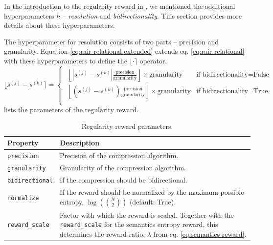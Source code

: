 In the introduction to the regularity reward in , we mentioned the additional hyperparameters \(h\) -- \emph{resolution} and \emph{bidirectionality}.
This section provides more details about these hyperparameters.

The hyperparameter for resolution consists of two parts -- precision and granularity.
Equation \eqref{eq:rair-relational-extended} extends eq. \eqref{eq:rair-relational} with these hyperparameters to define the \(\lfloor \cdot \rceil\) operator.
\begin{equation}
    \lfloor s^{(j)} - s^{(k)} \rceil = \begin{cases}\begin{aligned}
        \left\lfloor \left| s^{(j)} - s^{(k)} \right| \frac{\text{precision}}{\text{granularity}} \right\rfloor \times \text{granularity} &\text{if bidirectionality} = \text{False}\\
        \left\lfloor \left( s^{(j)} - s^{(k)} \right) \frac{\text{precision}}{\text{granularity}} \right\rfloor \times \text{granularity} &\text{if bidirectionality} = \text{True}\\
    \end{aligned}\end{cases}
    \label{eq:rair-relational-extended}
\end{equation}
 lists the parameters of the regularity reward.
\begin{table}[H]
    \centering
    \begin{tabularx}{\textwidth}{C{3.9cm} L}
        \hline
        Property & Description\\
        \hline
        \texttt{precision} & Precision of the compression algorithm.\\
        \texttt{granularity} & Granularity of the compression algorithm.\\
        \texttt{bidirectional} & If the compression should be bidirectional.\\
        \texttt{normalize} & If the reward should be normalized by the maximum possible entropy, \(\log\left(\binom{N}{2}\right)\) (default: True).\\
        \texttt{reward\_scale} & Factor with which the reward is scaled. Together with the \texttt{reward\_scale} for the semantics entropy reward, this determines the reward ratio, \(\lambda\) from eq. \eqref{eq:semantics-reward}.\\
        \hline
    \end{tabularx}
    \caption{Regularity reward parameters.}
    \label{tab:regularity-reward-params}
\end{table}

